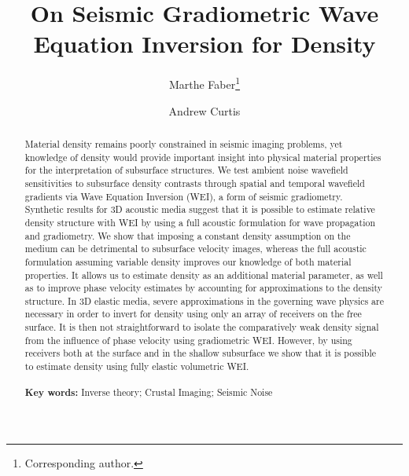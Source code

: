 \documentclass{article}
\title{On Seismic Gradiometric Wave Equation Inversion for Density}
\author[]{ \large Marthe Faber\thanks{Corresponding author.} }
\author[]{ \large Andrew Curtis}
\affil[]{\small University of Edinburgh, School of Geosciences, Edinburgh, UK \linebreak \linebreak
		 \textit{E-mails}: M.Faber@sms.ed.ac.uk (M.Faber), Andrew.Curtis@ed.ac.uk (A.Curtis)}
\date{}
\providecommand{\keywords}[1]
{
	\small	
	\textbf{\textbf{Key words:}} #1
}
\begin{document}
	\captionsetup[subfigure]{position=top, labelfont=bf,textfont=normalfont,singlelinecheck=off,justification=raggedright}
	\maketitle
	
	\begin{abstract}
		\noindent%
		Material density remains poorly constrained in seismic imaging problems, yet knowledge of density would provide important insight into physical material properties for the interpretation of subsurface structures. We test ambient noise wavefield sensitivities to subsurface density contrasts through spatial and temporal wavefield gradients via Wave Equation Inversion (WEI), a form of seismic gradiometry. Synthetic results for 3D acoustic media suggest that it is possible to estimate relative density structure with WEI by using a full acoustic formulation for wave propagation and gradiometry. We show that imposing a constant density assumption on the medium can be detrimental to subsurface velocity images, whereas the full acoustic formulation assuming variable density improves our knowledge of both material properties. It allows us to estimate density as an additional material parameter, as well as to improve phase velocity estimates by accounting for approximations to the density structure. In 3D elastic media, severe approximations in the governing wave physics are necessary in order to invert for density using only an array of receivers on the free surface. It is then not straightforward to isolate the comparatively weak density signal from the influence of phase velocity using gradiometric WEI. However, by using receivers both at the surface and in the shallow subsurface we show that it is possible to estimate density using fully elastic volumetric WEI. \\ \\%
		\keywords{Inverse theory; Crustal Imaging; Seismic Noise} %
	\end{abstract}
\end{document}
